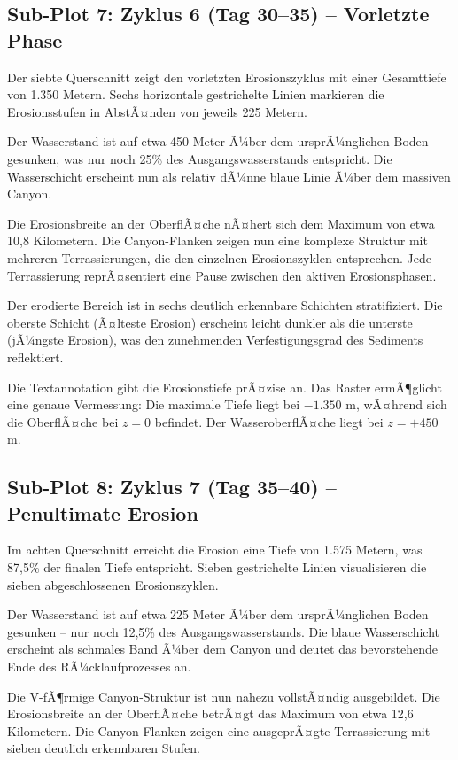 ﻿\documentclass[12pt,a4paper]{report}
\begin{document}
\subsection{Sub-Plot 7: Zyklus 6 (Tag 30--35) -- Vorletzte Phase}

Der siebte Querschnitt zeigt den vorletzten Erosionszyklus mit einer Gesamttiefe von 1.350 Metern. Sechs horizontale gestrichelte Linien markieren die Erosionsstufen in AbstÃ¤nden von jeweils 225 Metern.

Der Wasserstand ist auf etwa 450 Meter Ã¼ber dem ursprÃ¼nglichen Boden gesunken, was nur noch 25\% des Ausgangswasserstands entspricht. Die Wasserschicht erscheint nun als relativ dÃ¼nne blaue Linie Ã¼ber dem massiven Canyon.

Die Erosionsbreite an der OberflÃ¤che nÃ¤hert sich dem Maximum von etwa 10,8 Kilometern. Die Canyon-Flanken zeigen nun eine komplexe Struktur mit mehreren Terrassierungen, die den einzelnen Erosionszyklen entsprechen. Jede Terrassierung reprÃ¤sentiert eine Pause zwischen den aktiven Erosionsphasen.

Der erodierte Bereich ist in sechs deutlich erkennbare Schichten stratifiziert. Die oberste Schicht (Ã¤lteste Erosion) erscheint leicht dunkler als die unterste (jÃ¼ngste Erosion), was den zunehmenden Verfestigungsgrad des Sediments reflektiert.

Die Textannotation gibt die Erosionstiefe prÃ¤zise an. Das Raster ermÃ¶glicht eine genaue Vermessung: Die maximale Tiefe liegt bei $-1.350$ m, wÃ¤hrend sich die OberflÃ¤che bei $z = 0$ befindet. Der WasseroberflÃ¤che liegt bei $z = +450$ m.

\subsection{Sub-Plot 8: Zyklus 7 (Tag 35--40) -- Penultimate Erosion}

Im achten Querschnitt erreicht die Erosion eine Tiefe von 1.575 Metern, was 87,5\% der finalen Tiefe entspricht. Sieben gestrichelte Linien visualisieren die sieben abgeschlossenen Erosionszyklen.

Der Wasserstand ist auf etwa 225 Meter Ã¼ber dem ursprÃ¼nglichen Boden gesunken -- nur noch 12,5\% des Ausgangswasserstands. Die blaue Wasserschicht erscheint als schmales Band Ã¼ber dem Canyon und deutet das bevorstehende Ende des RÃ¼cklaufprozesses an.

Die V-fÃ¶rmige Canyon-Struktur ist nun nahezu vollstÃ¤ndig ausgebildet. Die Erosionsbreite an der OberflÃ¤che betrÃ¤gt das Maximum von etwa 12,6 Kilometern. Die Canyon-Flanken zeigen eine ausgeprÃ¤gte Terrassierung mit sieben deutlich erkennbaren Stufen.
\end{document}
